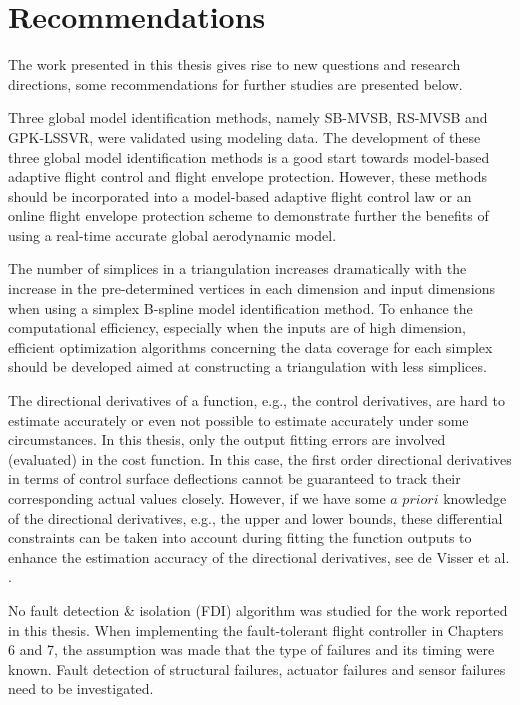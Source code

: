 \section{Recommendations}
\label{sec:06concl}

The work presented in this thesis gives rise to new questions and research directions, some recommendations for further studies are presented below.

Three global model identification methods, namely SB-MVSB, RS-MVSB and GPK-LSSVR, were validated using modeling data. The development of these three global model identification methods is a good start towards model-based adaptive flight control and flight envelope protection. However, these methods should be incorporated into a model-based adaptive flight control law or an online flight envelope protection scheme to demonstrate further the benefits of using a real-time accurate global aerodynamic model.

The number of simplices in a triangulation increases dramatically with the increase in the pre-determined vertices in each dimension and input dimensions when using a simplex B-spline model identification method. To enhance the computational efficiency, especially when the inputs are of high dimension, efficient optimization algorithms concerning the data coverage for each simplex should be developed aimed at constructing a triangulation with less simplices.

The directional derivatives of a function, e.g., the control derivatives, are hard to estimate accurately or even not possible to estimate accurately under some circumstances. 
In this thesis, only the output fitting errors are involved (evaluated) in the cost function. In this case, the first order directional derivatives in terms of control surface deflections cannot be guaranteed to track their corresponding actual values closely. However, if we have some $a$ $priori$ knowledge of the directional derivatives, e.g., the upper and lower bounds, these differential constraints can be taken into account during fitting the function outputs to enhance the estimation accuracy of the directional derivatives, see de Visser et al. \cite{deVisser11}.

No fault detection \& isolation (\ac{FDI}) algorithm was studied for the work reported in this thesis. When implementing the fault-tolerant flight controller in Chapters 6 and 7, the assumption was made that the type of failures and its timing were known. Fault detection of structural failures, actuator failures and sensor failures need to be investigated.

